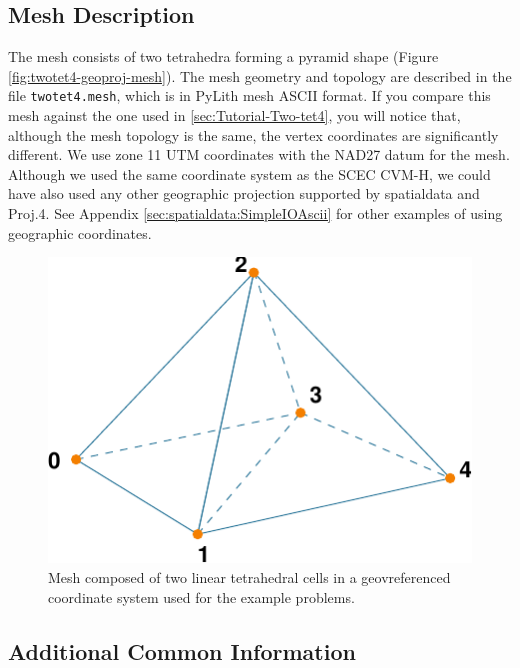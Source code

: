 \subsection{Mesh Description}

The mesh consists of two tetrahedra forming a pyramid shape (Figure
\vref{fig:twotet4-geoproj-mesh}). The mesh geometry and topology are
described in the file \texttt{twotet4.mesh}, which is in PyLith mesh
ASCII format. If you compare this mesh against the one used in \vref{sec:Tutorial-Two-tet4},
you will notice that, although the mesh topology is the same, the
vertex coordinates are significantly different. We use zone 11 UTM
coordinates with the NAD27 datum for the mesh. Although we used the
same coordinate system as the SCEC CVM-H, we could have also used
any other geographic projection supported by spatialdata and Proj.4.
See Appendix \vref{sec:spatialdata:SimpleIOAscii} for other examples
of using geographic coordinates. 

\noindent \begin{center}
\begin{figure}
\begin{centering}
\includegraphics{tutorials/twocells/figs/twotet4-mesh}
\par\end{centering}

\caption{Mesh composed of two linear tetrahedral cells in a geovreferenced coordinate
system used for the example problems.\label{fig:twotet4-geoproj-mesh}}
\end{figure}

\par\end{center}


\subsection{Additional Common Information}

